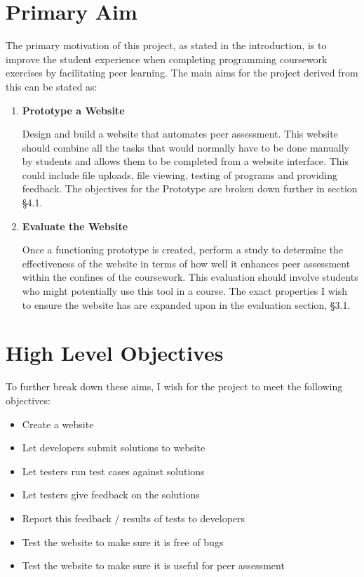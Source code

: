 \documentclass[a4paper,11pt]{report}
\begin{document}
\section{Primary Aim}
The primary motivation of this project, as stated in the introduction, is to improve the student experience when completing programming coursework exercises by facilitating peer learning. The main aims for the project derived from this can be stated as:
\begin{enumerate}
\item \textbf{Prototype a Website}\par
Design and build a website that automates peer assessment. This website should combine all the tasks that would normally have to be done manually by students and allows them to be completed from a website interface. This could include file uploads, file viewing, testing of programs and providing feedback. The objectives for the Prototype are broken down further in section \S4.1.
\item \textbf{Evaluate the Website}\par
Once a functioning prototype is created, perform a study to determine the effectiveness of the website in terms of how well it enhances peer assessment within the confines of the coursework. This evaluation should involve students who might potentially use this tool in a course. The exact properties I wish to ensure the website has are expanded upon in the evaluation section, \S3.1.
\end{enumerate}

\section{High Level Objectives}
To further break down these aims, I wish for the project to meet the following objectives:
\begin{itemize}
\item Create a website
\item Let developers submit solutions to website
\item Let testers run test cases against solutions
\item Let testers give feedback on the solutions
\item Report this feedback / results of tests to developers
\item Test the website to make sure it is free of bugs
\item Test the website to make sure it is useful for peer assessment
\end{itemize}
\end{document}
